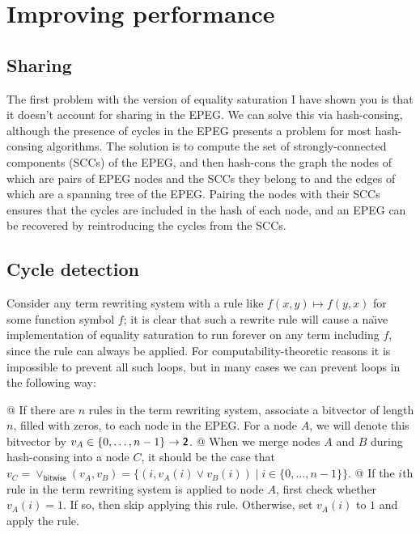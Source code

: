 \documentclass[11pt]{report}
\newcommand{\textbs}[1]{{\sffamily\fontseries{sbc}\selectfont #1}}
\newcommand{\mathbs}[1]{\ensuremath{\text{\textbs{#1}}}}
\newcommand{\mbs}[1]{\ensuremath{\mathbs{#1}}}     %
\newcommand{\msf}[1]{\ensuremath{\mathsf{#1}}}     %
\begin{document}
\chapter{Improving performance}
\label{sec:improving-performance}

\section{Sharing}
\label{sec:sharing}

The first problem with the version of equality saturation I have shown you is
that it doesn't account for sharing in the EPEG. We can solve this via
hash-consing, although the presence of cycles in the EPEG presents a problem for
most hash-consing algorithms. The solution is to compute the set of
strongly-connected components (SCCs) of the EPEG, and then hash-cons the graph
the nodes of which are pairs of EPEG nodes and the SCCs they belong to and
the edges of which are a spanning tree of the EPEG. Pairing the nodes with their
SCCs ensures that the cycles are included in the hash of each node, and an EPEG
can be recovered by reintroducing the cycles from the SCCs.

\section{Cycle detection}
\label{sec:cycle-detection}

Consider any term rewriting system with a rule like $f(x, y) \mapsto f(y, x)$
for some function symbol $f$; it is clear that such a rewrite rule will cause
a na\"{\i}ve implementation of equality saturation to run forever on any term
including $f$, since the rule can always be applied. For computability-theoretic
reasons it is impossible to prevent all such loops, but in many cases we can
prevent loops in the following way:

\begin{easylist}[itemize]
@ {%
  If there are $n$ rules in the term rewriting system, associate a bitvector of
  length $n$, filled with zeros, to each node in the EPEG. For a node $A$, we
  will denote this bitvector by $v_A \in \{0, \ldots, n - 1\} \to \mbs{2}$.
}
@ {%
  When we merge nodes $A$ and $B$ during hash-consing into a node $C$, it should
  be the case that
  $ v_C
  = {\lor}_\msf{bitwise}(v_A, v_B)
  = \{(i, v_A(i) \lor v_B(i)) \mid i \in \{0, \ldots, n - 1\}\}$.
}
@ {%
  If the $i$th rule in the term rewriting system is applied to node $A$, first
  check whether $v_A(i) = 1$. If so, then skip applying this rule. Otherwise,
  set $v_A(i)$ to $1$ and apply the rule.
}
\end{easylist}
\end{document}
